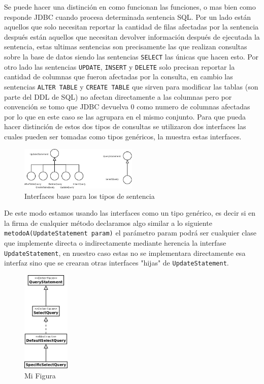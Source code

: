 Se puede hacer una distinción en como funcionan las funciones, o mas bien como responde JDBC cuando procesa determinada sentencia SQL. Por un lado están aquellos que solo necesitan reportar la cantidad de filas afectadas por la sentencia después están aquellos que necesitan devolver información después de ejecutada la sentencia, estas ultimas sentencias son precisamente las que realizan consultas sobre la base de datos siendo las sentencias \verb=SELECT= las únicas que hacen esto. Por otro lado las sentencias \verb=UPDATE=, \verb=INSERT= y \verb=DELETE= solo precisan reportar la cantidad de columnas que fueron afectadas por la consulta, en cambio las sentencias \verb=ALTER TABLE= y \verb=CREATE TABLE= que sirven para modificar las tablas (son parte del DDL de SQL) no afectan directamente a las columnas pero por convención se tomo que JDBC devuelva 0 como numero de columnas afectadas por lo que en este caso se las agrupara en el mismo conjunto. Para que \jj pueda hacer distinción de estos dos tipos de consultas se utilizaron dos interfaces las cuales pueden ser tomadas como tipos genéricos, la  muestra estas interfaces.\\

\begin{figure}
  \centering
    \includegraphics[width=0.5\textwidth]{figuras/crossdb-base.png}
  \caption{Interfaces base para los tipos de sentencia}
  \label{fig:crossdb-base}
\end{figure}

De este modo estamos usando las interfaces como un tipo genérico, es decir si en la firma de cualquier método declaramos algo similar a lo siguiente \verb=metodoA(UpdateStatement param)= el parámetro param podrá ser cualquier clase que implemente directa o indirectamente mediante herencia la interfase \verb=UpdateStatement=, en nuestro caso estas no se implementara directamente esa interfaz sino que se crearan otras interfaces "hijas" de \verb=UpdateStatement=.\\

\begin{figure}
  \centering
    \includegraphics[width=0.2\textwidth]{figuras/crossdb-query.png}
  \caption{Mi Figura}
  \label{fig:query}
\end{figure}

